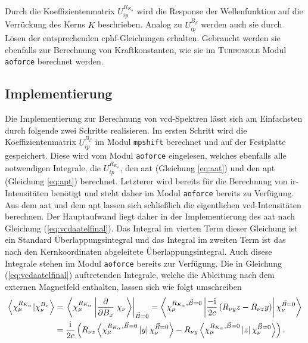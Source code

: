 	Durch die Koeffizientenmatrix $U_{ip}^{R_{K_\alpha}}$ wird die Response der Wellenfunktion auf die Verrückung des Kerns $K$ beschrieben. Analog zu $U_{ip}^{B_\beta}$ werden auch sie durch Lösen der entsprechenden \ac{cphf}-Gleichungen erhalten. Gebraucht werden sie ebenfalls zur Berechnung von Kraftkonstanten, wie sie im \textsc{Turbomole} Modul \texttt{aoforce}\supercite{deglmann2002efficient} berechnet werden.
	
	\subsection{Implementierung}
Die Implementierung zur Berechnung von \ac{vcd}-Spektren lässt sich am Einfachsten durch folgende zwei Schritte realisieren. Im ersten Schritt wird die Koeffizientenmatrix $U_{ip}^{B_\beta}$ im Modul \texttt{mpshift} berechnet und auf der Festplatte gespeichert. Diese wird vom Modul \texttt{aoforce} eingelesen, welches ebenfalls alle notwendigen Integrale, die $U_{ip}^{R_{K_\alpha}}$, den \ac{aat} (Gleichung \ref{eq:aat}) und den \ac{apt} (Gleichung \ref{eq:apt}) berechnet. Letzterer wird bereits für die Berechnung von \ac{ir}-Intensitäten benötigt und steht daher im Modul \texttt{aoforce} bereits zu Verfügung. Aus dem \ac{aat} und dem \ac{apt} lassen sich schließlich die eigentlichen \ac{vcd}-Intensitäten berechnen. Der Hauptaufwand liegt daher in der Implementierung des \ac{aat} nach Gleichung (\ref{eq:vcdaatelfinal}). Das Integral im vierten Term dieser Gleichung ist ein Standard Überlappungsintegral und das Integral im zweiten Term ist das nach den Kernkoordinaten abgeleitete Überlappungsintegral. Auch disese Integrale stehen im Modul \texttt{aoforce} bereits zur Verfügung.	Die in Gleichung (\ref{eq:vcdaatelfinal}) auftretenden Integrale, welche die Ableitung nach dem externen Magnetfeld enthalten, lassen sich wie folgt umschreiben
	\begin{equation}\label{eq:ddipx}
	\begin{aligned}
	\left\langle\chi_\mu^{R_{K_\alpha}}\vert\chi_\nu^{B_x}\right\rangle&=\left.\left\langle\chi_\mu^{R_{K_\alpha}}\left|\frac{\partial}{\partial B_x}\right.\chi_\nu\right\rangle\right|_{\vec{B}=0}=\left\langle\chi_\mu^{R_{K_\alpha},\vec{B}=0}\left|\frac{-\mathrm{i}\mkern1mu}{2c}\left(R_{\nu y}z-R_{\nu z}y\right)\right|\chi_\nu^{\vec{B}=0}\right\rangle\\
	  &=\frac{\mathrm{i}\mkern1mu}{2c}\left(R_{\nu z}\left\langle\chi_\mu^{R_{K_\alpha},\vec{B}=0}\left|y\right|\chi_\nu^{\vec{B}=0}\right\rangle-R_{\nu y}\left\langle\chi_\mu^{R_{K_\alpha},\vec{B}=0}\left|z\right|\chi_\nu^{\vec{B}=0}\right\rangle\right).
	  \end{aligned}
	\end{equation}
	
